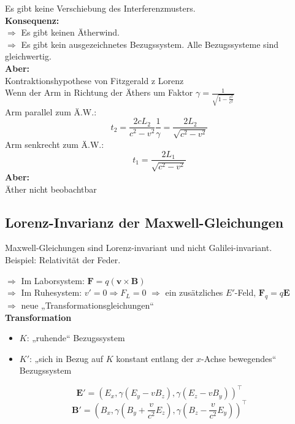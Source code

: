 \documentclass[titlepage,11pt,a4paper,ngerman]{report}
\renewcommand{\vec}[1]{\boldsymbol{#1}}
\begin{document}
Es gibt keine Verschiebung des Interferenzmusters.\\[5pt]
\textbf{Konsequenz:}\\
$ \Rightarrow $ Es gibt keinen Ätherwind.\\
$ \Rightarrow $ Es gibt kein ausgezeichnetes Bezugssystem. Alle Bezugssysteme sind gleichwertig.\\[5pt]
\textbf{Aber:}\\
Kontraktionshypothese von Fitzgerald z Lorenz\\
Wenn der Arm in Richtung der Äthers um Faktor $ \gamma = \frac{1}{\sqrt{1 - \frac{v^2}{c^2}}} $ \\
Arm parallel zum Ä.W.:
\begin{equation*}
t_2 = \frac{2cL_2}{c^2 - v^2} \frac{1}{\gamma} = \frac{2 L_2}{\sqrt{c^2 - v^2}}
\end{equation*}
Arm senkrecht zum Ä.W.:
\begin{equation*}
t_1 = \frac{2L_1}{\sqrt{c^2 - v^2}}
\end{equation*}
\textbf{Aber:}\\
Äther nicht beobachtbar

\subsection{Lorenz-Invarianz der Maxwell-Gleichungen}

Maxwell-Gleichungen sind Lorenz-invariant und nicht Galilei-invariant.\\
Beispiel: Relativität der Feder. 





\noindent
$\Rightarrow$ Im Laborsystem: $\vec{F}=q(\vec{v}\times\vec{B})$\\
$\Rightarrow$ Im Ruhesystem: $v'=0\Rightarrow F_L=0$ %
$\Rightarrow$ ein zusätzliches $E'$-Feld, $\vec{F}_q=q\vec{E}$\\
$\Rightarrow$ neue „Transformationsgleichungen“\\
\textbf{Transformation}
\begin{itemize}
	\item $K$: „ruhende“ Bezugssystem
	\item $K'$: „sich in Bezug auf $K$ konstant entlang der $x$-Achse bewegendes“ Bezugssystem
\end{itemize}

$$\vec{E}'=(E_x,\gamma(E_y-vB_z),\gamma(E_z-vB_y))^\top$$
$$\vec{B}'=(B_x,\gamma(B_y+\frac{v}{c^2}E_z),\gamma(B_z-\frac{v}{c^2}E_y))^\top$$
\end{document}
